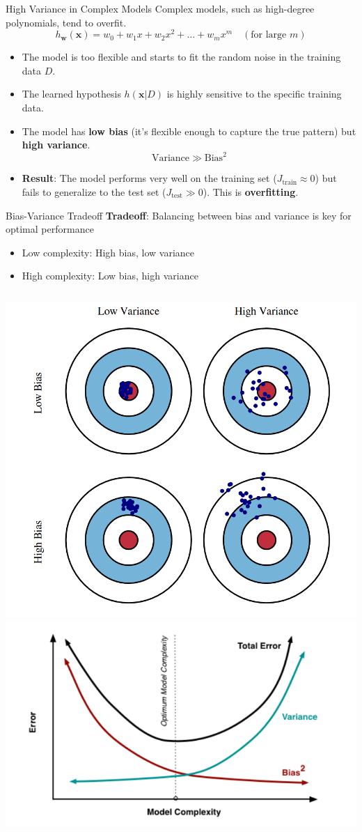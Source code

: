 \documentclass[serif, aspectratio=169]{beamer}
\begin{document}
\begin{frame}{High Variance in Complex Models}
    Complex models, such as high-degree polynomials, tend to overfit.
    \[
    h_{\mathbf{w}}(\mathbf{x}) = w_0 + w_1 x + w_2 x^2 + \dots + w_m x^m \quad (\text{for large } m)
    \]
    \begin{itemize}
        \item The model is too flexible and starts to fit the random noise in the training data $D$.
        \item The learned hypothesis $h(\mathbf{x} \vert D)$ is highly sensitive to the specific training data.
        \item The model has \textbf{low bias} (it's flexible enough to capture the true pattern) but \textbf{high variance}.
        \[
        \text{Variance} \gg \text{Bias}^2
        \]
        \item \textbf{Result}: The model performs very well on the training set ($J_{\text{train}} \approx 0$) but fails to generalize to the test set ($J_{\text{test}} \gg 0$). This is \textbf{overfitting}.
    \end{itemize}
\end{frame}


\begin{frame}{Bias-Variance Tradeoff}
    \textbf{Tradeoff}: Balancing between bias and variance is key for optimal performance
    \begin{itemize}
        \item Low complexity: High bias, low variance
        \item High complexity: Low bias, high variance
    \end{itemize}
    \[
    \]
    \begin{center}
    \includegraphics[width=0.35\linewidth]{pic/bias-variance.png}
    \hspace{0.25cm}
    \includegraphics[width=0.5\linewidth]{pic/bias-variance2.png}
 \end{center}

\end{frame}
\end{document}
